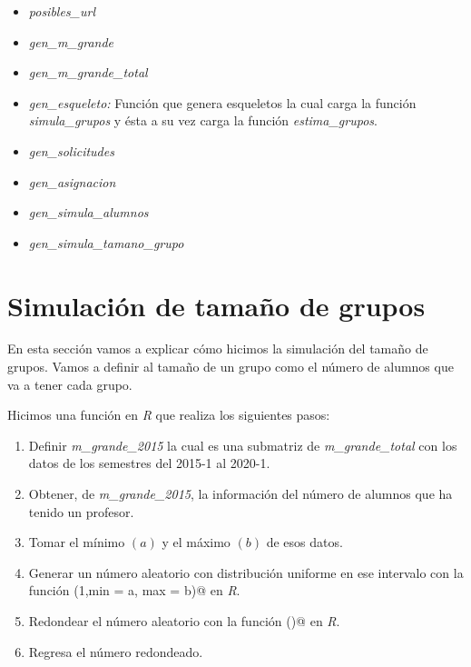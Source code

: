 \begin{itemize}
\item \textit{posibles\_url}

\item \textit{gen\_m\_grande}

\item \textit{gen\_m\_grande\_total}

\item \textit{gen\_esqueleto: } Función que genera esqueletos la cual carga la función \textit{simula\_grupos} y ésta a su vez carga la función \textit{estima\_grupos}.

\item \textit{gen\_solicitudes}

\item \textit{gen\_asignacion}

\item \textit{gen\_simula\_alumnos}

\item \textit{gen\_simula\_tamano\_grupo}
\end{itemize}




\section{Simulación de tamaño de grupos}

En esta sección vamos a explicar cómo hicimos la simulación del tamaño de grupos. Vamos a definir al tamaño de un grupo como el número de alumnos que va a tener cada grupo.

Hicimos una función en \textit{R} que realiza los siguientes pasos:

\begin{enumerate}
\item Definir \textit{m\_grande\_2015} la cual es una submatriz de \textit{m\_grande\_total} con los datos de los semestres del 2015-1 al 2020-1.

\item Obtener, de \textit{m\_grande\_2015}, la información del número de alumnos que ha tenido un profesor.

\item Tomar el mínimo $(a)$ y el máximo $(b)$ de esos datos.

\item Generar un número aleatorio con distribución uniforme en ese intervalo con la función \verb@runif(1,min = a, max = b)@ en \textit{R}.

\item Redondear el número aleatorio con la función \verb@ceiling()@ en \textit{R}.

\item Regresa el número redondeado.
\end{enumerate}

